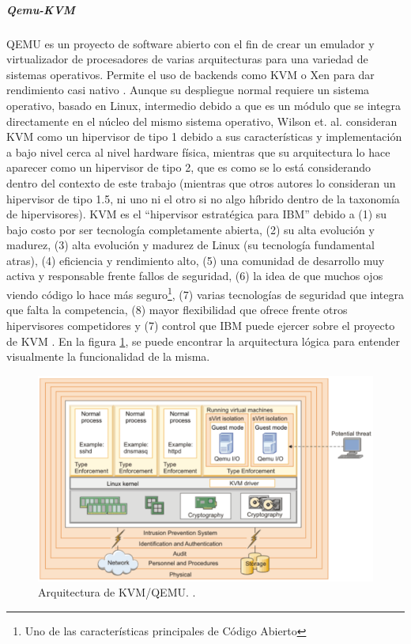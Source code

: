 \subparagraph{Qemu-KVM}
QEMU es un proyecto de software abierto con el fin de crear un emulador y virtualizador de procesadores de varias arquitecturas para una variedad de sistemas operativos. Permite el uso de backends como KVM o Xen para dar rendimiento casi nativo \citep{QEMU}. Aunque su despliegue normal requiere un sistema operativo, basado en Linux, intermedio debido a que es un módulo que se integra directamente en el núcleo del mismo sistema operativo, Wilson et. al. consideran KVM como un hipervisor de tipo 1 debido a sus características y implementación a bajo nivel cerca al nivel hardware física, mientras que su arquitectura lo hace aparecer como un hipervisor de tipo 2, que es como se lo está considerando dentro del contexto de este trabajo (mientras que otros autores lo consideran un hipervisor de tipo 1.5, ni uno ni el otro si no algo híbrido dentro de la taxonomía de hipervisores). KVM es el “hipervisor estratégica para IBM” debido a (1) su bajo costo por ser tecnología completamente abierta, (2) su alta evolución y madurez, (3) alta evolución y madurez de Linux (su tecnología fundamental atras), (4) eficiencia y rendimiento alto, (5) una comunidad de desarrollo muy activa y responsable frente fallos de seguridad, (6) la idea de que muchos ojos viendo código lo hace más seguro\footnote{Uno de las características principales de Código Abierto}, (7) varias tecnologías de seguridad que integra que falta la competencia, (8) mayor flexibilidad que ofrece frente otros hipervisores competidores y (7) control que IBM puede ejercer sobre el proyecto de KVM \citep{IBM-KVM-Security}. En la figura \ref{KVM-Arq}, se puede encontrar la arquitectura lógica para entender visualmente la funcionalidad de la misma.
  

\begin{figure}
  \begin{center}
      \includegraphics[width=\textwidth]{Figures/kvm-arq.png}
  \end{center}
  \caption{Arquitectura de KVM/QEMU. \citep{IBM-KVM-Security}.}
  \label{KVM-Arq}
\end{figure}


